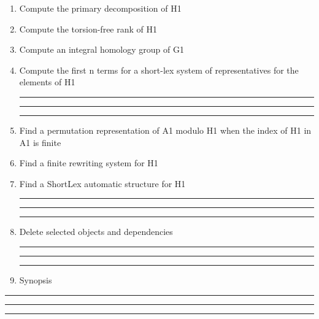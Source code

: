 \begin{enumerate}
\item Compute the primary decomposition of H1

\item Compute the torsion-free rank of H1

\item Compute an integral homology group of G1

\item Compute the first n terms for a short-lex system of representatives for the
elements of H1

\bigskip
\hrule\hrule\hrule

\item Find a permutation representation of A1 modulo H1 when the
index of H1 in A1 is finite

\item Find a finite rewriting system for H1

\item Find a ShortLex automatic structure for H1

\bigskip
\hrule\hrule\hrule

\item Delete selected objects and dependencies
\bigskip
\hrule\hrule\hrule
\item Synopsis
\end{enumerate}
\bigskip
\hrule\hrule\hrule
